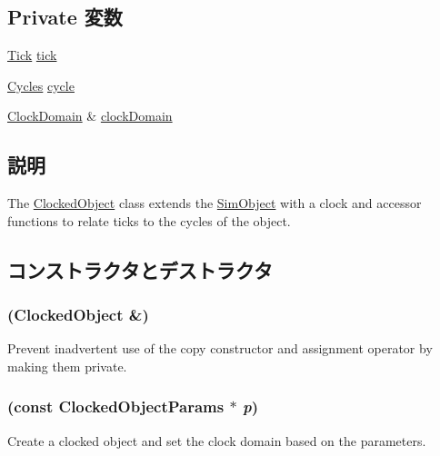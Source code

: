 \subsection*{Private 変数}
\begin{DoxyCompactItemize}
\item 
\hyperlink{base_2types_8hh_a5c8ed81b7d238c9083e1037ba6d61643}{Tick} \hyperlink{classClockedObject_a4daae57fbf09ee5423d123f5ce330e92}{tick}
\item 
\hyperlink{classCycles}{Cycles} \hyperlink{classClockedObject_a5dd7a975aae396561aafab3faa698033}{cycle}
\item 
\hyperlink{classClockDomain}{ClockDomain} \& \hyperlink{classClockedObject_a17a99a3f3123d51a0fcd65c59a58763d}{clockDomain}
\end{DoxyCompactItemize}


\subsection{説明}
The \hyperlink{classClockedObject}{ClockedObject} class extends the \hyperlink{classSimObject}{SimObject} with a clock and accessor functions to relate ticks to the cycles of the object. 

\subsection{コンストラクタとデストラクタ}
\hypertarget{classClockedObject_a92f78d5c8554a264a3b22b90b452de45}{
\subsubsection[{ClockedObject}]{ ({\bf ClockedObject} \&)}}
\label{classClockedObject_a92f78d5c8554a264a3b22b90b452de45}
Prevent inadvertent use of the copy constructor and assignment operator by making them private. \hypertarget{classClockedObject_a3106e3ad89e9d5ed67751bd9a2ee8c68}{
\subsubsection[{ClockedObject}]{ (const ClockedObjectParams $\ast$ {\em p})}}
\label{classClockedObject_a3106e3ad89e9d5ed67751bd9a2ee8c68}
Create a clocked object and set the clock domain based on the parameters. 


